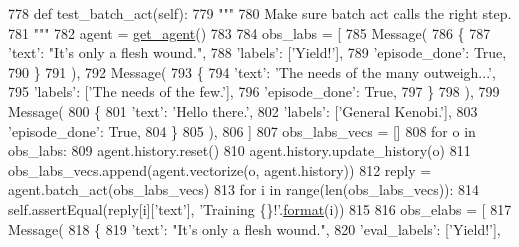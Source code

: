 \begin{DoxyCode}
778     \textcolor{keyword}{def }test\_batch\_act(self):
779         \textcolor{stringliteral}{"""}
780 \textcolor{stringliteral}{        Make sure batch act calls the right step.}
781 \textcolor{stringliteral}{        """}
782         agent = \hyperlink{namespacetests_1_1test__torch__agent_ae929d109305aaea29fbfa13ecf1f32e9}{get\_agent}()
783 
784         obs\_labs = [
785             Message(
786                 \{
787                     \textcolor{stringliteral}{'text'}: \textcolor{stringliteral}{"It's only a flesh wound."},
788                     \textcolor{stringliteral}{'labels'}: [\textcolor{stringliteral}{'Yield!'}],
789                     \textcolor{stringliteral}{'episode\_done'}: \textcolor{keyword}{True},
790                 \}
791             ),
792             Message(
793                 \{
794                     \textcolor{stringliteral}{'text'}: \textcolor{stringliteral}{'The needs of the many outweigh...'},
795                     \textcolor{stringliteral}{'labels'}: [\textcolor{stringliteral}{'The needs of the few.'}],
796                     \textcolor{stringliteral}{'episode\_done'}: \textcolor{keyword}{True},
797                 \}
798             ),
799             Message(
800                 \{
801                     \textcolor{stringliteral}{'text'}: \textcolor{stringliteral}{'Hello there.'},
802                     \textcolor{stringliteral}{'labels'}: [\textcolor{stringliteral}{'General Kenobi.'}],
803                     \textcolor{stringliteral}{'episode\_done'}: \textcolor{keyword}{True},
804                 \}
805             ),
806         ]
807         obs\_labs\_vecs = []
808         \textcolor{keywordflow}{for} o \textcolor{keywordflow}{in} obs\_labs:
809             agent.history.reset()
810             agent.history.update\_history(o)
811             obs\_labs\_vecs.append(agent.vectorize(o, agent.history))
812         reply = agent.batch\_act(obs\_labs\_vecs)
813         \textcolor{keywordflow}{for} i \textcolor{keywordflow}{in} range(len(obs\_labs\_vecs)):
814             self.assertEqual(reply[i][\textcolor{stringliteral}{'text'}], \textcolor{stringliteral}{'Training \{\}!'}.\hyperlink{namespaceparlai_1_1chat__service_1_1services_1_1messenger_1_1shared__utils_a32e2e2022b824fbaf80c747160b52a76}{format}(i))
815 
816         obs\_elabs = [
817             Message(
818                 \{
819                     \textcolor{stringliteral}{'text'}: \textcolor{stringliteral}{"It's only a flesh wound."},
820                     \textcolor{stringliteral}{'eval\_labels'}: [\textcolor{stringliteral}{'Yield!'}],

\end{DoxyCode}
